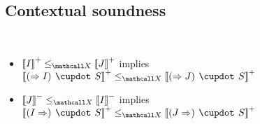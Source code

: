 \subsection{Contextual soundness}

\begin{lemma}[Functoriality]
  ~\\\vspace{-1em}
  \begin{itemize}
    \item $\psint{I} \sementX \psint{J}$ implies $\psint{(\seq I) \mix S} \sementX
    \psint{(\seq J) \mix S}$
    \item $\nsint{J} \sementX \nsint{I}$ implies $\psint{(I \seq) \mix S}
    \sementX \psint{(J \seq) \mix S}$
  \end{itemize}
\end{lemma}

